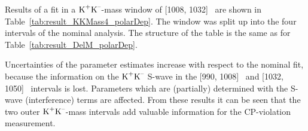 Results of a fit in a $\text{K}^\text{+}\text{K}^\text{--}$-mass window of [1008, 1032]~\MeV{} are shown in Table~\ref{tab:result_KKMass4_polarDep}. The window was split
up into the four intervals of the nominal analysis. The structure of the table is the same as for Table~\ref{tab:result_DelM_polarDep}.

Uncertainties of the parameter estimates increase with respect to the nominal fit, because the information on the $\text{K}^\text{+}\text{K}^\text{--}$ S-wave in the [990,
1008]~\MeV{} and [1032, 1050]~\MeV{} intervals is lost. Parameters which are (partially) determined with the S-wave (interference) terms
are affected. From these results it can be seen that the two outer $\text{K}^\text{+}\text{K}^\text{--}$-mass intervals add valuable information for the CP-violation
measurement.

